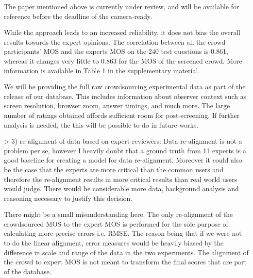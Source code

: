 \documentclass{article}
\begin{document}
The paper mentioned above is currently under review, and will be available for reference before the deadline of the camera-ready.

While the approach leads to an increased reliability, it does not bias the overall results towards the expert opinions. The correlation between all the crowd participants’ MOS and the experts MOS on the 240 test questions is 0.861, whereas it changes very little to 0.863 for the MOS of the screened crowd.  More information is available in Table 1 in the supplementary material.

We will be providing the full raw crowdsourcing experimental data as part of the release of our database. This includes information about observer context such as screen resolution, browser zoom, answer timings, and much more. The large number of ratings obtained affords sufficient room for post-screening. If further analysis is needed, the this will be possible to do in future works.

  
> 3) re-alignment of data based on expert reviewers: Data re-alignment is not a problem per se, however I heavily doubt that a ground truth from 11 experts is a good baseline for creating a model for data re-alignment. Moreover it could also be the case that the experts are more critical than the common users and therefore the re-alignment results in more critical results than real world users would judge. There would be considerable more data, background analysis and reasoning necessary to justify this decision.

There might be a small misunderstanding here. The only re-alignment of the crowdsourced MOS to the expert MOS is performed for the sole purpose of calculating more precise errors i.e. RMSE. The reason being that if we were not to do the linear alignment, error measures would be heavily biased by the difference in scale and range of the data in the two experiments. The alignment of the crowd to expert MOS is not meant to transform the final scores that are part of the database.


\fi
\end{document}
